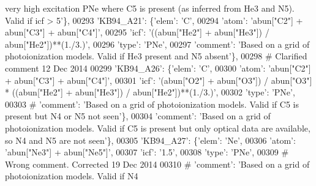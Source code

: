 \begin{DoxyCode}
{       very high excitation PNe where C5 is present (as inferred from He3 and N5). Valid if icf > 5'}\},
00293                          \textcolor{stringliteral}{'KB94\_A21'}: \{\textcolor{stringliteral}{'elem'}: \textcolor{stringliteral}{'C'},
00294                                       \textcolor{stringliteral}{'atom'}: \textcolor{stringliteral}{'abun["C2"] + abun["C3"] + abun["C4"]'},
00295                                       \textcolor{stringliteral}{'icf'}: \textcolor{stringliteral}{'((abun["He2"] + abun["He3"]) / abun["He2"])**(1./3.)'},
00296                                       \textcolor{stringliteral}{'type'}: \textcolor{stringliteral}{'PNe'},
00297                                       \textcolor{stringliteral}{'comment'}: \textcolor{stringliteral}{'Based on a grid of photoionization models. Valid if He3
       present and N5 absent'}\},
00298 \textcolor{comment}{# Clarified comment 12 Dec 2014}
00299                          \textcolor{stringliteral}{'KB94\_A26'}: \{\textcolor{stringliteral}{'elem'}: \textcolor{stringliteral}{'C'},
00300                                       \textcolor{stringliteral}{'atom'}: \textcolor{stringliteral}{'abun["C2"] + abun["C3"] + abun["C4"]'},
00301                                       \textcolor{stringliteral}{'icf'}: \textcolor{stringliteral}{'(abun["O2"] + abun["O3"]) / abun["O3"] * ((abun["He2"] +
       abun["He3"]) / abun["He2"])**(1./3.)'},
00302                                       \textcolor{stringliteral}{'type'}: \textcolor{stringliteral}{'PNe'},
00303 \textcolor{comment}{#                                      'comment': 'Based on a grid of photoionization models. Valid if C5
       is present but N4 or N5 not seen'\},}
00304                                       \textcolor{stringliteral}{'comment'}: \textcolor{stringliteral}{'Based on a grid of photoionization models. Valid if C5 is
       present but only optical data are available, so N4 and N5 are not seen'}\},
00305                          \textcolor{stringliteral}{'KB94\_A27'}: \{\textcolor{stringliteral}{'elem'}: \textcolor{stringliteral}{'Ne'},
00306                                       \textcolor{stringliteral}{'atom'}: \textcolor{stringliteral}{'abun["Ne3"] + abun["Ne5"]'},
00307                                       \textcolor{stringliteral}{'icf'}: \textcolor{stringliteral}{'1.5'},
00308                                       \textcolor{stringliteral}{'type'}: \textcolor{stringliteral}{'PNe'},
00309 \textcolor{comment}{# Wrong comment. Corrected 19 Dec 2014}
00310 \textcolor{comment}{#                                      'comment': 'Based on a grid of photoionization models. Valid if N4
}
\end{DoxyCode}
